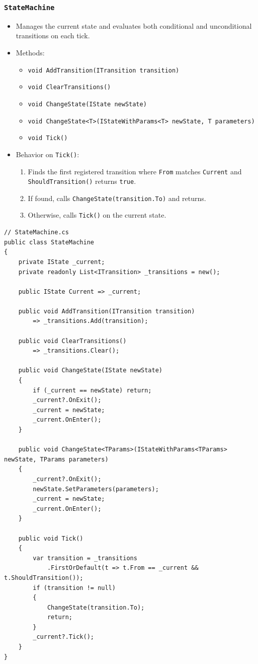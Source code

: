 \subsubsection{\texttt{StateMachine}}
\begin{itemize}
  \item Manages the current state and evaluates both conditional and unconditional transitions on each tick.
  \item Methods:
    \begin{itemize}
      \item \verb|void AddTransition(ITransition transition)|  
      \item \verb|void ClearTransitions()|  
      \item \verb|void ChangeState(IState newState)|  
      \item \verb|void ChangeState<T>(IStateWithParams<T> newState, T parameters)|  
      \item \verb|void Tick()|
    \end{itemize}
  \item Behavior on \verb|Tick()|:
    \begin{enumerate}
      \item Finds the first registered transition where \verb|From| matches \verb|Current| and \verb|ShouldTransition()| returns \texttt{true}.
      \item If found, calls \verb|ChangeState(transition.To)| and returns.
      \item Otherwise, calls \verb|Tick()| on the current state.
    \end{enumerate}
\end{itemize}

\begin{verbatim}
// StateMachine.cs
public class StateMachine
{
    private IState _current;
    private readonly List<ITransition> _transitions = new();

    public IState Current => _current;

    public void AddTransition(ITransition transition) 
        => _transitions.Add(transition);

    public void ClearTransitions() 
        => _transitions.Clear();

    public void ChangeState(IState newState)
    {
        if (_current == newState) return;
        _current?.OnExit();
        _current = newState;
        _current.OnEnter();
    }

    public void ChangeState<TParams>(IStateWithParams<TParams> newState, TParams parameters)
    {
        _current?.OnExit();
        newState.SetParameters(parameters);
        _current = newState;
        _current.OnEnter();
    }

    public void Tick()
    {
        var transition = _transitions
            .FirstOrDefault(t => t.From == _current && t.ShouldTransition());
        if (transition != null)
        {
            ChangeState(transition.To);
            return;
        }
        _current?.Tick();
    }
}
\end{verbatim}

